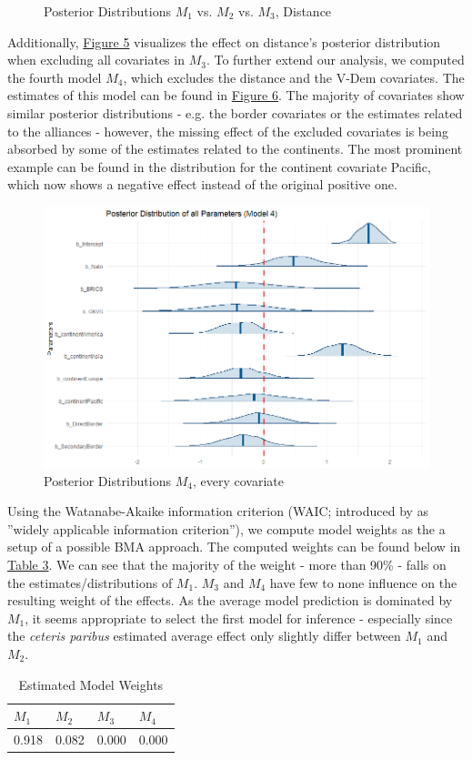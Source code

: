 \documentclass[12pt,a4paper]{article}
\begin{document}
\begin{figure}[h]
\caption{Posterior Distributions $M_1$ vs. $M_2$ vs. $M_3$, Distance}
\end{figure}

Additionally, \hyperref[F:5]{\color{blue}Figure 5} visualizes the effect on distance's posterior distribution when excluding all covariates in $M_3$. To further extend our analysis, we computed the fourth model $M_4$, which excludes the distance and the V-Dem covariates. The estimates of this model can be found in \hyperref[F:6]{\color{blue}Figure 6}. The majority of covariates show similar posterior distributions - e.g. the border covariates or the estimates related to the alliances - however, the missing effect of the excluded covariates is being absorbed by some of the estimates related to the continents. The most prominent example can be found in the distribution for the continent covariate Pacific, which now shows a negative effect instead of the original positive one.

\begin{figure}[h]
\center
\label{F:6}
\includegraphics[scale=0.5]{PosteriorPlot_Everything_Model4NoDistnace.png}
\caption{Posterior Distributions $M_4$, every covariate}
\end{figure}


Using the Watanabe-Akaike information criterion (WAIC; introduced by \citealp{watanabe2010} as ''widely applicable information criterion''), we compute model weights as the a setup of a possible BMA approach. The computed weights can be found below in \hyperref[T:3]{\color{blue}Table 3}. We can see that the majority of the weight - more than 90\% - falls on the estimates/distributions of $M_1$. $M_3$ and $M_4$ have few to none influence on the resulting weight of the effects. As the average model prediction is dominated by $M_1$, it seems appropriate to select the first model for inference - especially since the \textit{ceteris paribus} estimated average effect only slightly differ between $M_1$ and $M_2$.
\begin{table}[!htbp] \centering 
  \caption{Estimated Model Weights} 
  \label{T:3} 
\begin{tabular}{llll}
\hline \hline
$M_1$& $M_2$ & $M_3$& $M_4$\\ \hline
0.918 & 0.082 & 0.000 & 0.000 \\ \hline \hline
\end{tabular}
\end{table}
 
\end{document}
